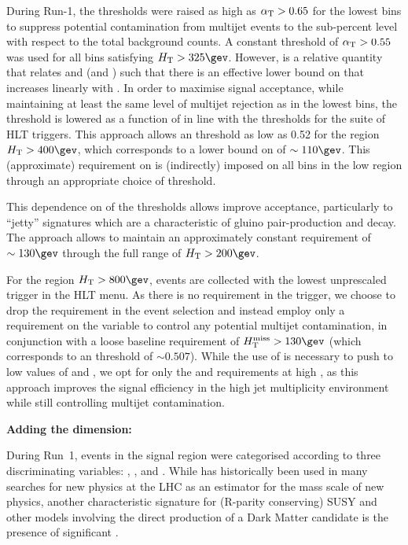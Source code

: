 During Run-1, the \alphat thresholds were raised as high as $\alpha_{\text{T}} >
0.65$ for the lowest \scalht bins to suppress potential contamination
from multijet events to the sub-percent level with respect to the
total background counts. A constant threshold of $\alpha_{\text{T}} > 0.55$ was
used for all bins satisfying $\scalht > 325\gev$. However, \alphat is
a relative quantity that relates \scalht and \mht (and \dht) such that
there is an effective lower bound on \mht that increases linearly with
\scalht. In order to maximise signal acceptance, while maintaining at
least the same level of multijet rejection as in the lowest \scalht
bins, the \alphat threshold is lowered as a function of \scalht
in line with the thresholds for the suite of HLT triggers. This
approach allows an \alphat threshold as low as 0.52 for the
region $\scalht > 400\gev$, which corresponds to a lower bound on \mht
of $\sim110\gev$. This (approximate) requirement on \mht is
(indirectly) imposed on all bins in the low \scalht region through an
appropriate choice of \alphat threshold.

This dependence on \scalht of the \alphat thresholds allows improve acceptance, 
particularly to ``jetty'' signatures which are a
characteristic of gluino pair-production and decay. The approach
allows to maintain an approximately constant \mht requirement of
$\sim130\gev$ through the full range of $\scalht > 200\gev$.

For the region $\scalht > 800\gev$, events are collected with the
lowest unprescaled \scalht trigger in the HLT menu. As there is no
\alphat requirement in the trigger, we choose to drop the \alphat
requirement in the event selection and instead employ only a
requirement on the variable \bdphi to control any potential multijet
contamination, in conjunction with a loose baseline requirement of
$\mht > 130\gev$ (which corresponds to an \alphat threshold of
$\sim0.507$). While the use of \alphat is necessary to push to low
values of \scalht and \mht, we opt for only the \bdphi and \mht
requirements at high \scalht, as this approach improves the signal
efficiency in the high jet multiplicity environment while still
controlling multijet contamination.

{\bf Adding the \mht dimension:}

During Run~1, events in the signal region were categorised according
to three discriminating variables: \scalht, \njet, and \nb. While
\scalht has historically been used in many searches for new physics at
the LHC as an estimator for the mass scale of new physics, another
characteristic signature for (R-parity conserving) SUSY and other
models involving the direct production of a Dark Matter candidate is
the presence of significant \met.

